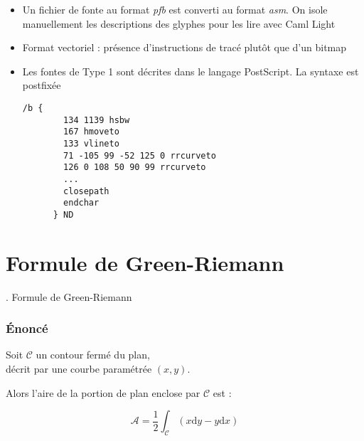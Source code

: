 \documentclass[french]{beamer}
\begin{document}
\begin{frame}[fragile]

  \begin{itemize}

  \item
    Un fichier de fonte au format \emph{pfb} est converti au format \emph{asm}. On isole manuellement les descriptions des glyphes pour les lire avec Caml Light

  \item
    Format vectoriel : présence d'instructions de tracé plutôt que d'un bitmap

  \item
    Les fontes de Type 1 sont décrites dans le langage PostScript. La syntaxe est postfixée
    
    \begin{lstlisting}[title={\tiny \fbox{Extrait de la description du glyphe de \emph{b} en Arial}}]
      /b {
        134 1139 hsbw
        167 hmoveto
        133 vlineto
        71 -105 99 -52 125 0 rrcurveto
        126 0 108 50 90 99 rrcurveto
        ...
        closepath
        endchar
      } ND
    \end{lstlisting}
    
  \end{itemize}

\end{frame}

\section{Formule de Green-Riemann}

\begin{frame}
  \center \LARGE \thesection. Formule de Green-Riemann
\end{frame}

\begin{frame}
  \frametitle{Énoncé}

  Soit $\mathcal{C}$ un contour fermé du plan, \\
  décrit par une courbe paramétrée $(x,y)$.

  Alors l'aire de la portion de plan enclose par $\mathcal{C}$ est :

  \[\mathcal{A} = \frac{1}{2} \int_{\mathcal{C}} (x \mathrm{d}y - y \mathrm{d}x)\]
  
\end{frame}
\end{document}
